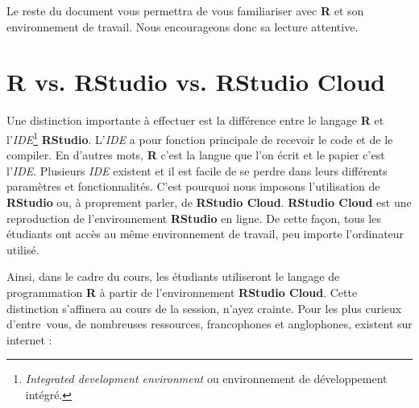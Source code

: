 \documentclass[10.5pt,a4paper]{article}
\begin{document}
Le reste du document vous permettra de vous familiariser avec \textbf{R} et son environnement de travail. Nous encourageons donc sa lecture attentive.

\section{R vs. RStudio vs. RStudio Cloud}\label{R vs RStudio vs RStudio Cloud}

Une distinction importante à effectuer est la différence entre le langage \textbf{R} et l'\textit{IDE}\footnote{\emph{Integrated development environment} ou environnement de développement intégré.} \textbf{RStudio}. L'\textit{IDE} a pour fonction principale de recevoir le code et de le compiler. En d'autres mots, \textbf{R} c'est la langue que l'on écrit et le papier c'est l'\textit{IDE}. Plusieurs \textit{IDE} existent et il est facile de se perdre dans leurs différents paramètres et fonctionnalités. C'est pourquoi nous imposons l'utilisation de \textbf{RStudio} ou, à proprement parler, de \textbf{RStudio Cloud}. \textbf{RStudio Cloud} est une reproduction de l'environnement \textbf{RStudio} en ligne. De cette façon, tous les étudiants ont accès au même environnement de travail, peu importe l'ordinateur utilisé.  

Ainsi, dans le cadre du cours, les étudiants utiliseront le langage de programmation \textbf{R} à partir de l'environnement \textbf{RStudio Cloud}. Cette distinction s'affinera au cours de la session, n'ayez crainte. Pour les plus curieux d'entre\ vous, de nombreuses ressources, francophones et anglophones, existent sur internet :
\end{document}
